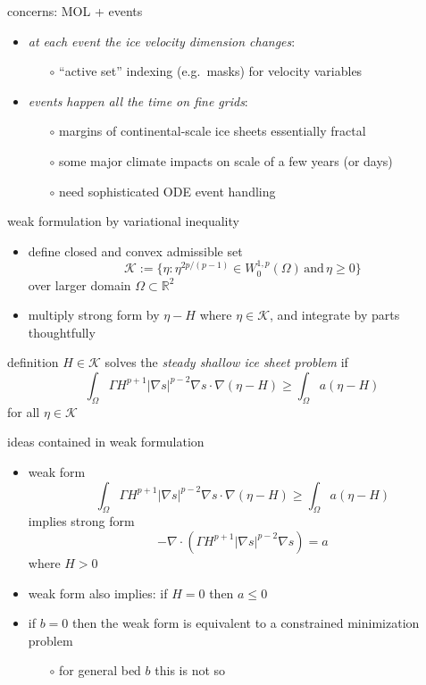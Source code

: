 \documentclass[hide notes,intlimits]{beamer}
\newcommand{\RR}{\mathbb{R}}
\newcommand{\Kcal}{\mathcal{K}}
\newcommand{\Div}{\nabla\cdot}
\newcommand{\grad}{\nabla}
\begin{document}
\begin{frame}{concerns: MOL + events}

\begin{itemize}
\item \emph{at each event the ice velocity dimension changes}:
    \begin{itemize}
    \item[$\circ$] ``active set'' indexing (e.g.~masks) for velocity variables
    \end{itemize}
\item \emph{events happen all the time on fine grids}:
    \begin{itemize}
    \item[$\circ$] margins of continental-scale ice sheets essentially fractal
    \item[$\circ$] some major climate impacts on scale of a few years (or days)
    \item[$\circ$] need sophisticated ODE event handling
    \end{itemize}
\end{itemize}
\end{frame}




\begin{frame}{weak formulation by variational inequality} 
\begin{itemize}
\item define closed and convex admissible set
  $$\Kcal := \{\eta : \eta^{2p/(p-1)} \in W^{1,p}_0 (\Omega) \,\text{and}\, \eta \ge 0\}$$
over larger domain $\Omega \subset \RR^2$
\item multiply strong form by $\eta-H$ where $\eta\in \Kcal$, and integrate by parts thoughtfully
\end{itemize}
\begin{block}{definition} 
$H \in \Kcal$ solves the \emph{steady shallow ice sheet problem} if
  $$\int_{\Omega}  \Gamma H^{p+1} |\grad s|^{p-2} \grad s \cdot \grad(\eta - H)  
\ge \int_{\Omega} a (\eta - H)$$
for all $\eta \in \Kcal$
\end{block}
\end{frame}


\begin{frame}{ideas contained in weak formulation} 
\begin{itemize}
\item weak form
  $$\int_{\Omega}  \Gamma H^{p+1} |\grad s|^{p-2} \grad s \cdot \grad(\eta - H)  
\ge \int_{\Omega} a (\eta - H)$$
implies strong form
  $$-\Div \left(\Gamma H^{p+1} |\nabla s|^{p-2} \nabla s  \right) =  a$$
where $H>0$
\item weak form also implies: if $H=0$ then $a \le 0$
\item if $b=0$ then the weak form is equivalent to a constrained minimization problem
  \begin{itemize}
  \item[$\circ$] for general bed $b$ this is not so
  \end{itemize}
\end{itemize}
\end{frame}
\end{document}
